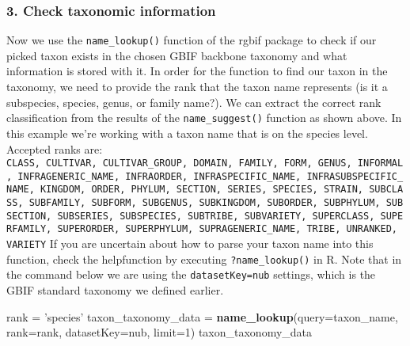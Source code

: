 \documentclass[]{article}
\newenvironment{Shaded}{\begin{snugshade}}{\end{snugshade}}
\newcommand{\DataTypeTok}[1]{\textcolor[rgb]{0.13,0.29,0.53}{#1}}
\newcommand{\DecValTok}[1]{\textcolor[rgb]{0.00,0.00,0.81}{#1}}
\newcommand{\KeywordTok}[1]{\textcolor[rgb]{0.13,0.29,0.53}{\textbf{#1}}}
\newcommand{\NormalTok}[1]{#1}
\newcommand{\StringTok}[1]{\textcolor[rgb]{0.31,0.60,0.02}{#1}}
\begin{document}
\hypertarget{check-taxonomic-information}{%
\subsubsection{3. Check taxonomic
information}\label{check-taxonomic-information}}

Now we use the \texttt{name\_lookup()} function of the rgbif package to
check if our picked taxon exists in the chosen GBIF backbone taxonomy
and what information is stored with it. In order for the function to
find our taxon in the taxonomy, we need to provide the rank that the
taxon name represents (is it a subspecies, species, genus, or family
name?). We can extract the correct rank classification from the results
of the \texttt{name\_suggest()} function as shown above. In this example
we're working with a taxon name that is on the species level. Accepted
ranks are:
\texttt{CLASS,\ CULTIVAR,\ CULTIVAR\_GROUP,\ DOMAIN,\ FAMILY,\ FORM,\ GENUS,\ INFORMAL,\ INFRAGENERIC\_NAME,\ INFRAORDER,\ INFRASPECIFIC\_NAME,\ INFRASUBSPECIFIC\_NAME,\ KINGDOM,\ ORDER,\ PHYLUM,\ SECTION,\ SERIES,\ SPECIES,\ STRAIN,\ SUBCLASS,\ SUBFAMILY,\ SUBFORM,\ SUBGENUS,\ SUBKINGDOM,\ SUBORDER,\ SUBPHYLUM,\ SUBSECTION,\ SUBSERIES,\ SUBSPECIES,\ SUBTRIBE,\ SUBVARIETY,\ SUPERCLASS,\ SUPERFAMILY,\ SUPERORDER,\ SUPERPHYLUM,\ SUPRAGENERIC\_NAME,\ TRIBE,\ UNRANKED,\ VARIETY}
If you are uncertain about how to parse your taxon name into this
function, check the helpfunction by executing \texttt{?name\_lookup()}
in R. Note that in the command below we are using the
\texttt{datasetKey=nub} settings, which is the GBIF standard taxonomy we
defined earlier.

\begin{Shaded}
\begin{Highlighting}[]
\NormalTok{rank =}\StringTok{ 'species'}
\NormalTok{taxon_taxonomy_data =}\StringTok{ }\KeywordTok{name_lookup}\NormalTok{(}\DataTypeTok{query=}\NormalTok{taxon_name, }\DataTypeTok{rank=}\NormalTok{rank, }\DataTypeTok{datasetKey=}\NormalTok{nub, }\DataTypeTok{limit=}\DecValTok{1}\NormalTok{)}
\NormalTok{taxon_taxonomy_data}
\end{Highlighting}
\end{Shaded}
\end{document}
